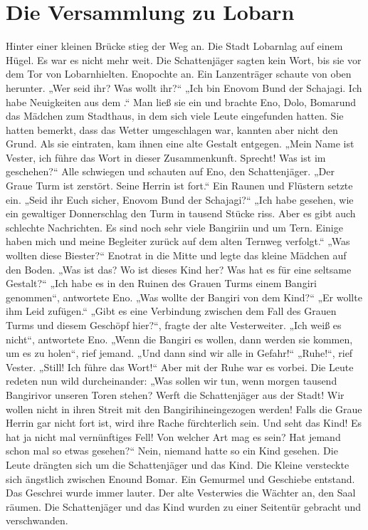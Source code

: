 \documentclass[12pt,a4paper,onecolumn,twoside,ngerman]{book}
\newcommand{\Tern}{Tern}
\newcommand{\Bangiri}{Bangiri}
\newcommand{\Eno}{Eno}
\newcommand{\Bomar}{Bomar}
\newcommand{\Do}{Dolo}
\newcommand{\Lobarn}{Lobarn}
\newcommand{\Vester}{Vester}
\begin{document}
\section{Die Versammlung zu \Lobarn}
Hinter einer kleinen Brücke stieg der Weg an. Die Stadt \Lobarn lag auf einem  Hügel. Es war es nicht mehr weit. Die Schattenjäger sagten kein Wort, bis sie vor dem Tor von \Lobarn hielten. \Eno pochte an.
Ein Lanzenträger schaute von oben herunter. 
„Wer seid ihr? Was wollt ihr?“
„Ich bin \Eno vom Bund der Schajagi. Ich habe Neuigkeiten aus dem \Enland.“ 
Man ließ sie ein und brachte \Eno, \Do, \Bomar und das Mädchen zum Stadthaus, in dem sich viele Leute eingefunden hatten. Sie hatten bemerkt, dass das Wetter umgeschlagen war, kannten aber nicht den Grund. Als sie eintraten, kam ihnen eine alte Gestalt entgegen. 
„Mein Name ist \Vester, ich führe das Wort in dieser Zusammenkunft. Sprecht! Was ist im \Enland geschehen?“
Alle schwiegen und schauten auf \Eno, den Schattenjäger.
„Der Graue Turm ist zerstört. Seine Herrin ist fort.“
Ein Raunen und Flüstern setzte ein.
„Seid ihr Euch sicher, \Eno vom Bund der Schajagi?“
„Ich habe gesehen, wie ein gewaltiger Donnerschlag den Turm in tausend Stücke riss. Aber es gibt auch schlechte Nachrichten. Es sind noch sehr viele \Bangiri in und um \Tern. Einige haben mich und meine Begleiter zurück auf dem alten \Tern{weg} verfolgt.“
„Was wollten diese Biester?“
\Eno trat in die Mitte und legte das kleine Mädchen auf den Boden.
„Was ist das? Wo ist dieses Kind her? Was hat es für eine seltsame Gestalt?“
„Ich habe es in den Ruinen des Grauen Turms einem Bangiri genommen“, antwortete \Eno.
„Was wollte der Bangiri von dem Kind?“
„Er wollte ihm Leid zufügen.“
„Gibt es eine Verbindung zwischen dem Fall des Grauen Turms und diesem Geschöpf hier?“, fragte der alte \Vester weiter.
„Ich weiß es nicht“, antwortete \Eno.
„Wenn die Bangiri es wollen, dann werden sie kommen, um es zu holen“, rief jemand. „Und dann sind wir alle in Gefahr!“
„Ruhe!“, rief \Vester. „Still! Ich führe das Wort!“
Aber mit der Ruhe war es vorbei. Die Leute redeten nun wild durcheinander: „Was sollen wir tun, wenn morgen tausend \Bangiri vor unseren Toren stehen? Werft die Schattenjäger aus der Stadt! Wir wollen nicht in ihren Streit mit den \Bangiri hineingezogen werden! Falls die Graue Herrin gar nicht fort ist, wird ihre Rache fürchterlich sein. Und seht das Kind! Es hat ja nicht mal vernünftiges Fell! Von welcher Art mag es sein? Hat jemand schon mal so etwas gesehen?“
Nein, niemand hatte so ein Kind gesehen. Die Leute drängten sich um die Schattenjäger und das Kind. Die Kleine versteckte sich ängstlich zwischen \Eno und \Bomar. Ein Gemurmel und Geschiebe entstand. Das Geschrei wurde immer lauter. Der alte \Vester wies die Wächter an, den Saal räumen. Die Schattenjäger und das Kind wurden zu einer Seitentür gebracht und verschwanden.
\end{document}
